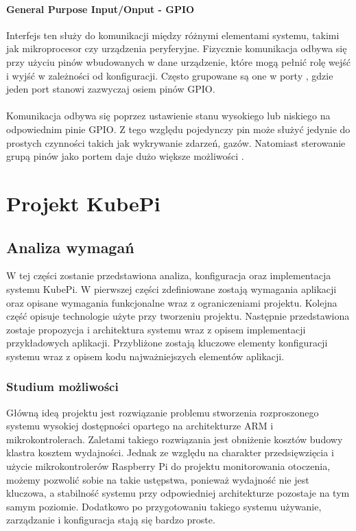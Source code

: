 \documentclass[12pt]{report}
\let\Oldsection\section
\renewcommand{\section}{\FloatBarrier\Oldsection}
\let\Oldsubsection\subsection
\renewcommand{\subsection}{\FloatBarrier\Oldsubsection}
\let\Oldsubsubsection\subsubsection
\renewcommand{\subsubsection}{\FloatBarrier\Oldsubsubsection}
\begin{document}
{\subsubsection{General Purpose Input/Onput - GPIO}
Interfejs ten służy do komunikacji między różnymi elementami systemu, takimi jak mikroprocesor czy urządzenia peryferyjne. Fizycznie komunikacja odbywa się przy użyciu pinów wbudowanych w dane urządzenie, które mogą pełnić rolę wejść i wyjść w zależności od konfiguracji. Często grupowane są one w porty , gdzie jeden port stanowi zazwyczaj osiem pinów GPIO. \\ \\
Komunikacja odbywa się poprzez ustawienie stanu wysokiego lub niskiego na odpowiednim pinie GPIO. Z tego względu pojedynczy pin może służyć jedynie do prostych czynności takich jak wykrywanie zdarzeń, gazów. Natomiast sterowanie grupą pinów jako portem daje dużo większe możliwości \cite{raspberry}.
\chapter{Projekt KubePi} \label{project}
\section{Analiza wymagań}
W tej części zostanie przedstawiona analiza, konfiguracja oraz implementacja systemu KubePi. W pierwszej części zdefiniowane zostają wymagania aplikacji oraz opisane wymagania funkcjonalne wraz z ograniczeniami projektu. Kolejna część opisuje technologie użyte przy tworzeniu projektu. Następnie przedstawiona zostaje propozycja i architektura systemu wraz z opisem implementacji przykładowych aplikacji. Przybliżone zostają kluczowe elementy konfiguracji systemu wraz z opisem kodu najważniejszych elementów aplikacji.

\subsection{Studium możliwości}
Główną ideą projektu jest rozwiązanie problemu stworzenia rozproszonego systemu wysokiej dostępności opartego na architekturze ARM i mikrokontrolerach. Zaletami takiego rozwiązania jest obniżenie kosztów budowy klastra kosztem wydajności. Jednak ze względu na charakter przedsięwzięcia i użycie mikrokontrolerów Raspberry Pi do projektu monitorowania otoczenia, możemy pozwolić sobie na takie ustępstwa, ponieważ wydajność nie jest kluczowa, a stabilność systemu przy odpowiedniej architekturze pozostaje na tym samym poziomie. Dodatkowo po przygotowaniu takiego systemu używanie, zarządzanie i konfiguracja stają się bardzo proste.

}
\end{document}
